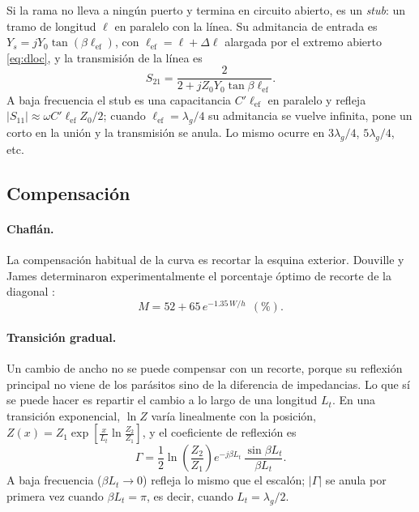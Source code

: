\documentclass[11pt,letterpaper]{article}
\begin{document}
Si la rama no lleva a ningún puerto y termina en circuito abierto, es un \emph{stub}: un tramo de longitud $\ell$ en paralelo con la línea. Su admitancia de entrada es $Y_s=jY_0\tan(\beta\ell_{\mathrm{ef}})$, con $\ell_{\mathrm{ef}}=\ell+\Delta\ell$ alargada por el extremo abierto \eqref{eq:dloc}, y la transmisión de la línea es
\begin{equation}
S_{21} = \frac{2}{2+jZ_0Y_0\tan\beta\ell_{\mathrm{ef}}}.
\label{eq:stub}
\end{equation}
A baja frecuencia el stub es una capacitancia $C'\ell_{\mathrm{ef}}$ en paralelo y refleja $|S_{11}|\approx\omega C'\ell_{\mathrm{ef}}Z_0/2$; cuando $\ell_{\mathrm{ef}}=\lambda_g/4$ su admitancia se vuelve infinita, pone un corto en la unión y la transmisión se anula. Lo mismo ocurre en $3\lambda_g/4$, $5\lambda_g/4$, etc.

\subsection{Compensación}
\paragraph{Chaflán.} La compensación habitual de la curva es recortar la esquina exterior. Douville y James determinaron experimentalmente el porcentaje óptimo de recorte de la diagonal \cite{douville}:
\begin{equation}
M = 52 + 65\,e^{-1.35\,W/h}\ \ (\%).
\label{eq:miter}
\end{equation}

\paragraph{Transición gradual.} Un cambio de ancho no se puede compensar con un recorte, porque su reflexión principal no viene de los parásitos sino de la diferencia de impedancias. Lo que sí se puede hacer es repartir el cambio a lo largo de una longitud $L_t$. En una transición exponencial, $\ln Z$ varía linealmente con la posición, $Z(x)=Z_1\exp\!\left[\frac{x}{L_t}\ln\frac{Z_2}{Z_1}\right]$, y el coeficiente de reflexión es \cite{pozar}
\begin{equation}
\Gamma = \frac{1}{2}\ln\!\left(\frac{Z_2}{Z_1}\right) e^{-j\beta L_t}\,\frac{\sin\beta L_t}{\beta L_t}.
\label{eq:taper}
\end{equation}
A baja frecuencia ($\beta L_t\to 0$) refleja lo mismo que el escalón; $|\Gamma|$ se anula por primera vez cuando $\beta L_t=\pi$, es decir, cuando $L_t=\lambda_g/2$.
\end{document}
